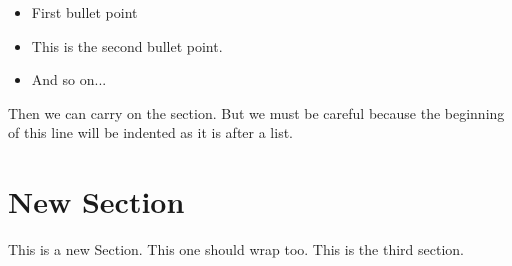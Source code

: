 \documentclass{article}
\begin{document}
\begin{itemize}
\item First bullet point
\item This is the second bullet point.
\item And so on...
\end{itemize}

Then we can carry on the section. But we must be careful because the beginning of this line will be indented as it is after a list.


\section{New Section}
This is a new Section. This one should wrap too. This is the third section.


\end{document}
